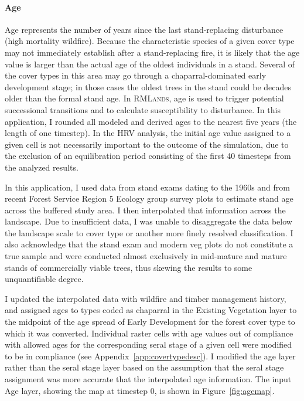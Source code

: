 \paragraph{Age}
Age represents the number of years since the last stand-replacing disturbance (high mortality wildfire). Because the characteristic species of a given cover type may not immediately establish after a stand-replacing fire, it is likely that the age value is larger than the actual age of the oldest individuals in a stand. Several of the cover types in this area may go through a chaparral-dominated early development stage; in those cases the oldest trees in the stand could be decades older than the formal stand age. In \textsc{RMLands}, age is used to trigger potential successional transitions and to calculate susceptibility to disturbance. In this application, I rounded all modeled and derived ages to the nearest five years (the length of one timestep). In the HRV analysis, the initial age value assigned to a given cell is not necessarily important to the outcome of the simulation, due to the exclusion of an equilibration period consisting of the first 40 timesteps from the analyzed results.

In this application, I used data from stand exams dating to the 1960s and from recent Forest Service Region 5 Ecology group survey plots to estimate stand age across the buffered study area. I then interpolated that information across the landscape. Due to insufficient data, I was unable to disaggregate the data below the landscape scale to cover type or another more finely resolved classification. I also acknowledge that the stand exam and modern veg plots do not constitute a true sample and were conducted almost exclusively in mid-mature and mature stands of commercially viable trees, thus skewing the results to some unquantifiable degree.

I updated the interpolated data with wildfire and timber management history, and assigned ages to types coded as chaparral in the Existing Vegetation layer to the midpoint of the age spread of Early Development for the forest cover type to which it was converted. Individual raster cells with age values out of compliance with allowed ages for the corresponding seral stage of a given cell were modified to be in compliance (see Appendix~\ref{app:covertypedesc}). I modified the age layer rather than the seral stage layer based on the assumption that the seral stage assignment was more accurate that the interpolated age information. The input Age layer, showing the map at timestep 0, is shown in Figure~\ref{fig:agemap}.


